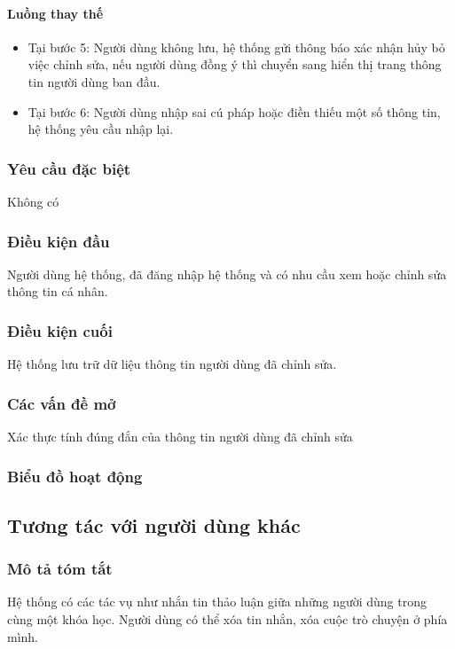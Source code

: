 \documentclass[./../main_file.tex]{subfiles}
\begin{document}
\paragraph{Luồng thay thế}
\begin{itemize}
	\item Tại bước 5: Người dùng không lưu, hệ thống gửi thông báo xác nhận hủy bỏ việc chỉnh sửa, nếu người dùng đồng ý thì chuyển sang hiển thị trang thông tin người dùng ban đầu.
	\item Tại bước 6: Người dùng nhập sai cú pháp hoặc điền thiếu một số thông tin, hệ thống yêu cầu nhập lại.
	
\end{itemize}
\subsubsection{Yêu cầu đặc biệt}
Không có

\subsubsection{Điều kiện đầu}
Người dùng hệ thống, đã đăng nhập hệ thống và có nhu cầu xem hoặc chỉnh sửa thông tin cá nhân.

\subsubsection{Điều kiện cuối}
Hệ thống lưu trữ dữ liệu thông tin người dùng đã chỉnh sửa.

\subsubsection{Các vấn đề mở}
Xác thực tính đúng đắn của thông tin người dùng đã chỉnh sửa

\subsubsection{Biểu đồ hoạt động}

\subsection{Tương tác với người dùng khác}
\subsubsection{Mô tả tóm tắt}
Hệ thống có các tác vụ như nhắn tin thảo luận giữa những người dùng trong cùng một khóa học. Người dùng có thể xóa tin nhắn, xóa cuộc trò chuyện ở phía mình.
\end{document}
